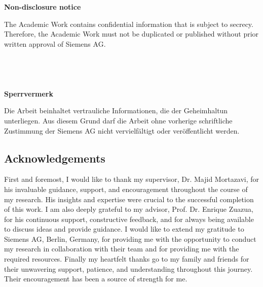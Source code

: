\documentclass[12pt,oneside,reqno,a4paper,twoside]{report}
\begin{document}
\newpage 

\textbf{Non-disclosure notice}


The Academic Work contains confidential information that is subject to secrecy. Therefore, the Academic Work must not be duplicated or published without prior written approval of Siemens AG.\\\\\\\\\\


\textbf{Sperrvermerk}


Die Arbeit beinhaltet vertrauliche Informationen, die der Geheimhaltun unterliegen. Aus diesem Grund darf die Arbeit ohne vorherige schriftliche Zustimmung der Siemens AG nicht vervielfältigt oder veröffentlicht werden.

\newpage
\begin{center}
    \section*{Acknowledgements}
\end{center}
\sloppy
First and foremost, I would like to thank my supervisor, Dr. Majid Mortazavi, for his invaluable guidance, support, and encouragement throughout the course of my research. His insights and expertise were crucial to the successful completion of this work.
I am also deeply grateful to my advisor, Prof. Dr. Enrique Zuazua, for his continuous support, constructive feedback, and for always being available to discuss ideas and provide guidance.
I would like to extend my gratitude to Siemens AG, Berlin, Germany, for providing me with the opportunity to conduct my research in collaboration with their team and for providing me with the required resources.
Finally my heartfelt thanks go to my family and friends for their unwavering support, patience, and understanding throughout this journey. Their encouragement has been a source of strength for me.

\newpage %






\clearpage

\renewcommand{\cftsecleader}{\cftdotfill{\cftdotsep}}
\tableofcontents

\clearpage {}

\clearpage
\clearpage

\clearpage

\clearpage

\clearpage


\end{document}

